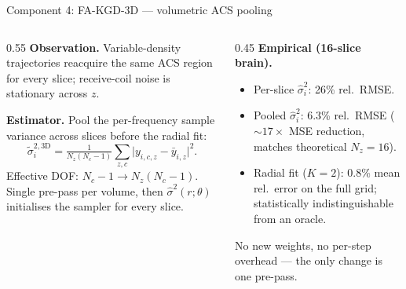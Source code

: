 \documentclass[aspectratio=169]{beamer}
\newcommand{\hatsig}{\hat{\sigma}}
\begin{document}
\begin{frame}{Component 4: FA-KGD-3D --- volumetric ACS pooling}
  \small
  \begin{columns}[T]
    \begin{column}{0.55\textwidth}
      \textbf{Observation.} Variable-density trajectories reacquire the same ACS region for every slice; receive-coil noise is stationary across $z$.

      \vspace{0.3em}
      \textbf{Estimator.} Pool the per-frequency sample variance across slices before the radial fit:
      \[
        \tilde\sigma_i^{2,\text{3D}} = \tfrac{1}{N_z(N_c-1)} \sum_{z,c} \bigl|y_{i,c,z} - \bar y_{i,z}\bigr|^2.
      \]
      Effective DOF: $N_c{-}1 \to N_z(N_c{-}1)$. Single pre-pass per volume, then $\hatsig^2(r;\theta)$ initialises the sampler for every slice.
    \end{column}
    \begin{column}{0.45\textwidth}
      \textbf{Empirical (16-slice brain).}
      \begin{itemize}
        \item Per-slice $\hatsig_i^2$: \alert{26\%} rel.\ RMSE.
        \item Pooled $\hatsig_i^2$: \alert{6.3\%} rel.\ RMSE ($\sim 17\times$ MSE reduction, matches theoretical $N_z{=}16$).
        \item Radial fit ($K{=}2$): \alert{0.8\%} mean rel.\ error on the full grid; statistically indistinguishable from an oracle.
      \end{itemize}
      \vspace{0.3em}
      \footnotesize
      No new weights, no per-step overhead --- the only change is one pre-pass.
    \end{column}
  \end{columns}
\end{frame}
\end{document}
